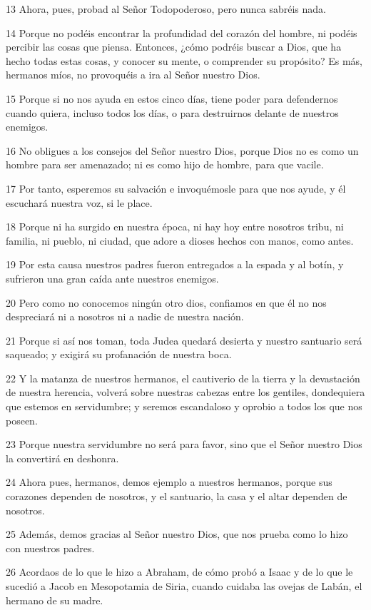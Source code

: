 \par 13 Ahora, pues, probad al Señor Todopoderoso, pero nunca sabréis nada.
\par 14 Porque no podéis encontrar la profundidad del corazón del hombre, ni podéis percibir las cosas que piensa. Entonces, ¿cómo podréis buscar a Dios, que ha hecho todas estas cosas, y conocer su mente, o comprender su propósito? Es más, hermanos míos, no provoquéis a ira al Señor nuestro Dios.
\par 15 Porque si no nos ayuda en estos cinco días, tiene poder para defendernos cuando quiera, incluso todos los días, o para destruirnos delante de nuestros enemigos.
\par 16 No obligues a los consejos del Señor nuestro Dios, porque Dios no es como un hombre para ser amenazado; ni es como hijo de hombre, para que vacile.
\par 17 Por tanto, esperemos su salvación e invoquémosle para que nos ayude, y él escuchará nuestra voz, si le place.
\par 18 Porque ni ha surgido en nuestra época, ni hay hoy entre nosotros tribu, ni familia, ni pueblo, ni ciudad, que adore a dioses hechos con manos, como antes.
\par 19 Por esta causa nuestros padres fueron entregados a la espada y al botín, y sufrieron una gran caída ante nuestros enemigos.
\par 20 Pero como no conocemos ningún otro dios, confiamos en que él no nos despreciará ni a nosotros ni a nadie de nuestra nación.
\par 21 Porque si así nos toman, toda Judea quedará desierta y nuestro santuario será saqueado; y exigirá su profanación de nuestra boca.
\par 22 Y la matanza de nuestros hermanos, el cautiverio de la tierra y la devastación de nuestra herencia, volverá sobre nuestras cabezas entre los gentiles, dondequiera que estemos en servidumbre; y seremos escandaloso y oprobio a todos los que nos poseen.
\par 23 Porque nuestra servidumbre no será para favor, sino que el Señor nuestro Dios la convertirá en deshonra.
\par 24 Ahora pues, hermanos, demos ejemplo a nuestros hermanos, porque sus corazones dependen de nosotros, y el santuario, la casa y el altar dependen de nosotros.
\par 25 Además, demos gracias al Señor nuestro Dios, que nos prueba como lo hizo con nuestros padres.
\par 26 Acordaos de lo que le hizo a Abraham, de cómo probó a Isaac y de lo que le sucedió a Jacob en Mesopotamia de Siria, cuando cuidaba las ovejas de Labán, el hermano de su madre.
